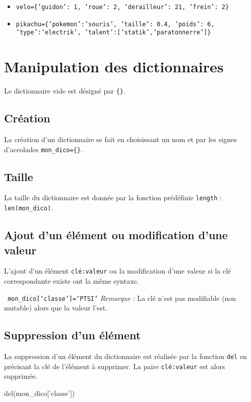 \begin{exemple}
\begin{itemize}
\item \texttt{velo=\{'guidon': 1, 'roue': 2, 'derailleur': 21, 'frein': 2\}}
\item \texttt{pikachu=\{'pokemon':'souris', 'taille': 0.4, 'poids': 6, 'type':'electrik', 'talent':['statik','paratonnerre']\}}
\end{itemize}
\end{exemple}

\section{Manipulation des dictionnaires}
Le dictionnaire vide est désigné par \texttt{\{\}}.
\subsection*{Création}
La création d'un dictionnaire se fait en choisissant un nom et par les signes d'accolades
\texttt{mon\_dico=\{\}}.

\subsection*{Taille}
La taille du dictionnaire est donnée par la fonction prédéfinie \lstinline{length} : 
\lstinline{len(mon_dico)}.


\subsection*{Ajout d'un élément ou modification d'une valeur}
L'ajout d'un élément \texttt{clé:valeur} ou la modification d'une valeur si la clé correspondante existe ont la même syntaxe.

\texttt{
mon\_dico['classe']='PTSI'}
\textit{Remarque} : La clé n'est pas modifiable (non mutable) alors que la valeur l'est.

\subsection*{Suppression d'un élément}
La suppression d'un élément du dictionnaire est réalisée par la fonction \texttt{del} en précisant la clé de l'élément à supprimer. La paire \texttt{clé:valeur} est alors supprimée.
\begin{python}
del(mon\_dico['classe'])
\end{python}

